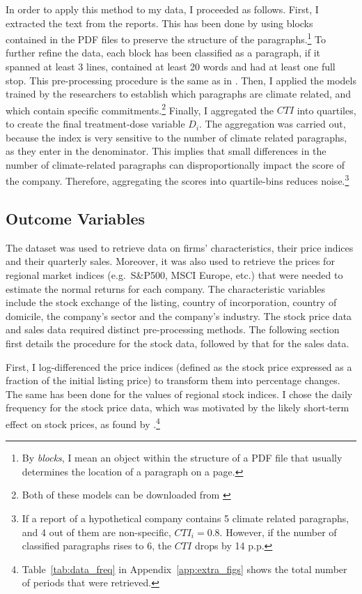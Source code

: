 \documentclass[12pt]{article}
\begin{document}
In order to apply this method to my data, I proceeded as follows. First, I extracted the text from the reports. This has been done by using blocks contained in the PDF files to preserve the structure of the paragraphs.\footnote{By \textit{blocks}, I mean an object within the structure of a PDF file that usually determines the location of a paragraph on a page.} To further refine the data, each block has been classified as a paragraph, if it spanned at least 3 lines, contained at least 20 words and had at least one full stop. This pre-processing procedure is the same as in \textcite{binglerHowCheapTalk2024}. Then, I applied the models trained by the researchers to establish which paragraphs are climate related, and which contain specific commitments.\footnote{Both of these models can be downloaded from \href{https://huggingface.co/climatebert}{}} Finally, I aggregated the $CTI$ into quartiles, to create the final treatment-dose variable $D_i$. The aggregation was carried out, because the index is very sensitive to the number of climate related paragraphs, as they enter in the denominator. This implies that small differences in the number of climate-related  paragraphs can disproportionally impact the score of the company. Therefore, aggregating the scores into quartile-bins reduces noise.\footnote{If a report of a hypothetical company contains 5 climate related paragraphs, and 4 out of them are non-specific, $CTI_i=0.8$. However, if the number of classified paragraphs rises to 6, the $CTI$ drops by 14 p.p.}



\subsection{Outcome Variables}

The \citeauthor{refinitiv2025} dataset was used to retrieve data on firms' characteristics, their price indices and their quarterly sales. Moreover, it was also used to retrieve the prices for regional market indices (e.g.\ S\&P500, MSCI Europe, etc.) that were needed to estimate the normal returns for each company. The characteristic variables include the stock exchange of the listing, country of incorporation, country of domicile, the company's sector and the company's industry. The stock price data and sales data required distinct pre-processing methods. The following section first details the procedure for the stock data, followed by that for the sales data.

First, I log-differenced the price indices (defined as the stock price expressed as a fraction of the initial listing price) to transform them into percentage changes. The same has been done for the values of regional stock indices. I chose the daily frequency for the stock price data, which was motivated by the likely short-term effect on stock prices, as found by \textcite{schusterStockPriceReactions2023}.\footnote{Table~\ref{tab:data_freq} in Appendix~\ref{app:extra_figs} shows the total number of periods that were retrieved.}
\end{document}
